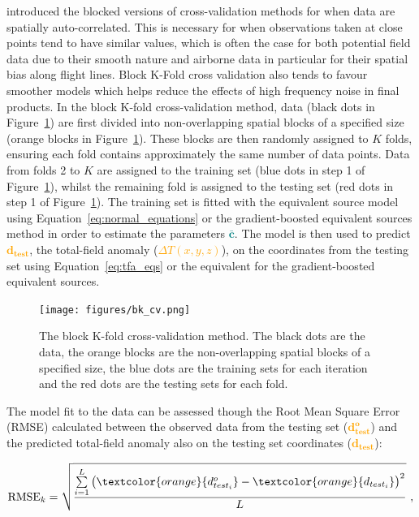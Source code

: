 \citet{Roberts2017} introduced the blocked versions of cross-validation methods
for when data are spatially auto-correlated. This is necessary for when
observations taken at close points tend to have similar values, which is often
the case for both potential field data due to their smooth nature and airborne
data in particular for their spatial bias along flight lines. Block K-Fold
cross validation also tends to favour smoother models which helps reduce the
effects of high frequency noise in final products. In the block K-fold
cross-validation method, data (black dots in Figure~\ref{fig:BK-CV}) are first
divided into non-overlapping spatial blocks of a specified size (orange blocks
in Figure~\ref{fig:BK-CV}). These blocks are then randomly assigned to $K$
folds, ensuring each fold contains approximately the same number of data
points. Data from folds 2 to $K$ are assigned to the training set (blue dots in
step 1 of Figure~\ref{fig:BK-CV}), whilst the remaining fold is assigned to the
testing set (red dots in step 1 of Figure~\ref{fig:BK-CV}). The training set is
fitted with the equivalent source model using
Equation~\ref{eq:normal_equations} or the gradient-boosted equivalent sources
method in order to estimate the parameters
\textcolor{teal}{$\bar{\mathbf{c}}$}. The model is then used to predict
\textcolor{orange}{$\mathbf{d_{test}}$}, the total-field anomaly
(\textcolor{orange}{$\Delta T (x, y, z)$}), on the coordinates from the testing
set using Equation~\ref{eq:tfa_eqs} or the equivalent for the gradient-boosted
equivalent sources.

\begin{figure}[tb]
  \centering
  \texttt{[image: figures/bk\_cv.png]}
  \caption{
    The block K-fold cross-validation method. The black dots are the data, the orange blocks are the non-overlapping spatial blocks of a specified size, the blue dots are the training sets for each iteration and the red dots are the testing sets for each fold.
    }
  \label{fig:BK-CV}
\end{figure}

The model fit to the data can be assessed though the Root Mean Square Error (RMSE) calculated between the observed data from the testing set (\textcolor{orange}{$\mathbf{d^o_{test}}$}) and the predicted total-field anomaly also on the testing set coordinates (\textcolor{orange}{$\mathbf{d_{test}}$}):

\begin{equation}
    \label{eq:rmse}
    \text{RMSE}_k = \sqrt{\dfrac{\sum\limits_{i=1}^L \left(\textcolor{orange}{{d^o_{test_i}}} - \textcolor{orange}{{d_{test_i}}}\right)^2}{L}}
    \ ,
\end{equation}

